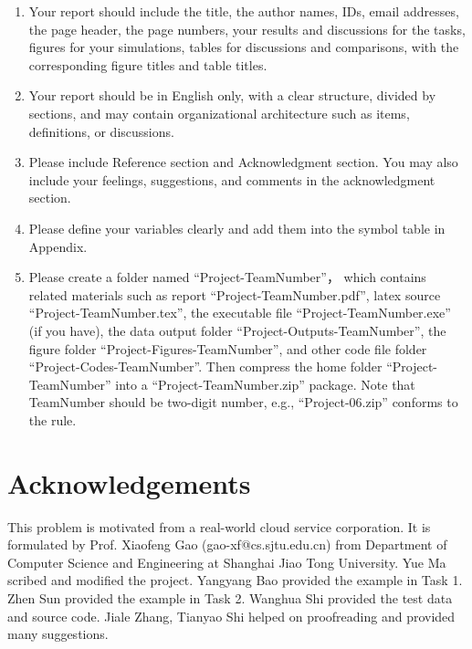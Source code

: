 \documentclass{llncs}
\begin{document}
\begin{enumerate}
  \item Your report should include the title, the author names, IDs, email addresses, the page header, the page numbers, your results and discussions for the tasks, figures for your simulations, tables for discussions and comparisons, with the corresponding figure titles and table titles.

  \item Your report should be in English only, with a clear structure, divided by sections, and may contain organizational architecture such as items, definitions, or discussions.

  \item Please include Reference section and Acknowledgment section. You may also include your feelings, suggestions, and comments in the acknowledgment section.

  \item Please define your variables clearly and add them into the symbol table in Appendix.

  \item Please create a folder named ``Project-TeamNumber''， which contains related materials such as report ``Project-TeamNumber.pdf'', latex source ``Project-TeamNumber.tex'', the executable file ``Project-TeamNumber.exe'' (if you have), the data output folder ``Project-Outputs-TeamNumber'', the figure folder ``Project-Figures-TeamNumber'', and other code file folder  ``Project-Codes-TeamNumber''. Then compress the home folder ``Project-TeamNumber'' into a ``Project-TeamNumber.zip'' package. Note that TeamNumber should be two-digit number, e.g., ``Project-06.zip'' conforms to the rule.
\end{enumerate}


\section*{Acknowledgements}
This problem is motivated from a real-world cloud service corporation. It is formulated by Prof. Xiaofeng Gao (gao-xf@cs.sjtu.edu.cn) from Department of Computer Science and Engineering at Shanghai Jiao Tong University. Yue Ma scribed and modified the project. Yangyang Bao provided the example in Task 1. Zhen Sun provided the example in Task 2. Wanghua Shi provided the test data and source code. Jiale Zhang, Tianyao Shi helped on proofreading and provided many suggestions.

\end{document}
